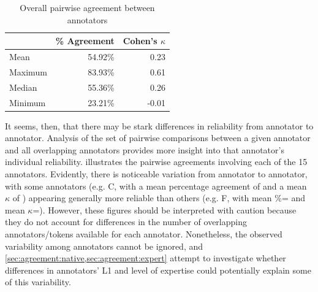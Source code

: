 		\begin{table}[tb]
			\centering
			\caption{Overall pairwise agreement between annotators}
			\begin{tabular}{lrr}
			\toprule
				&	\% Agreement	&	Cohen's $\kappa$	\\
			\midrule
Mean		&	54.92\%	&	0.23	\\
Maximum	&	83.93\%	&	0.61	\\
Median		&	55.36\%	&	0.26	\\
Minimum	&	23.21\%	&	-0.01	\\
			\bottomrule
			\end{tabular}						
			
			\label{tab:agreement:overall}
		\end{table}
	
	
	It seems, then, that there may be stark differences in reliability from annotator to annotator. Analysis of the set of pairwise comparisons between a given annotator and all overlapping annotators provides more insight into that annotator's individual reliability.  illustrates the pairwise agreements involving each of the 15 annotators.
	  Evidently, there is noticeable variation from annotator to annotator, with some annotators (e.g. C, with a mean percentage agreement of  and a mean $\kappa$ of ) appearing generally more reliable than others (e.g. F, with mean \%= and mean $\kappa$=).   However, these figures should be interpreted with caution because they do not account for differences in the number of overlapping annotators/tokens available for each annotator. %
	Nonetheless, the observed variability among annotators cannot be ignored, and \cref{sec:agreement:native,sec:agreement:expert} attempt to investigate whether differences in annotators' L1 and level of expertise could potentially explain some of this variability.
		
